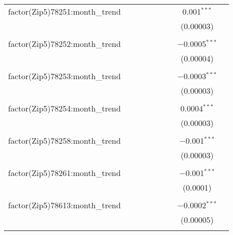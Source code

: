 \begin{table}[H]
{\begin{tabular}{@{\extracolsep{5pt}}lcccccccc}
  factor(Zip5)78251:month\_trend &  &  &  &  &  &  & 0.001$^{***}$ &  \\  

   &  &  &  &  &  &  & (0.00003) &  \\  

   & & & & & & & & \\  

  factor(Zip5)78252:month\_trend &  &  &  &  &  &  & $-$0.0005$^{***}$ &  \\  

   &  &  &  &  &  &  & (0.00004) &  \\  

   & & & & & & & & \\  

  factor(Zip5)78253:month\_trend &  &  &  &  &  &  & $-$0.0003$^{***}$ &  \\  

   &  &  &  &  &  &  & (0.00003) &  \\  

   & & & & & & & & \\  

  factor(Zip5)78254:month\_trend &  &  &  &  &  &  & 0.0004$^{***}$ &  \\  

   &  &  &  &  &  &  & (0.00003) &  \\  

   & & & & & & & & \\  

  factor(Zip5)78258:month\_trend &  &  &  &  &  &  & $-$0.001$^{***}$ &  \\  

   &  &  &  &  &  &  & (0.00003) &  \\  

   & & & & & & & & \\  

  factor(Zip5)78261:month\_trend &  &  &  &  &  &  & $-$0.001$^{***}$ &  \\  

   &  &  &  &  &  &  & (0.0001) &  \\  

   & & & & & & & & \\  

  factor(Zip5)78613:month\_trend &  &  &  &  &  &  & $-$0.0002$^{***}$ &  \\  

   &  &  &  &  &  &  & (0.00005) &  \\  

   & & & & & & & & \\  


\end{tabular}}
\end{table}
